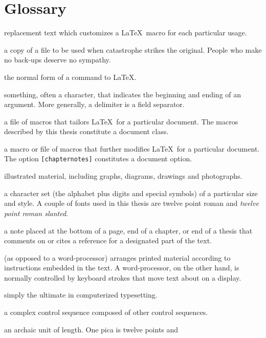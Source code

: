 \documentclass[11pt, proquest]{uwthesis}[2020/02/24]
\begin{document}
%
%
\tableofcontents
\listoffigures
\listoftables  %
 
%
%
\chapter*{Glossary}      %
\thispagestyle{plain}
%
\begin{glossary}
\item[argument] replacement text which customizes a \LaTeX\ macro for
each particular usage.
\item[back-up] a copy of a file to be used when catastrophe strikes
the original.  People who make no back-ups deserve
no sympathy.
\item[control sequence] the normal form of a command to \LaTeX.
\item[delimiter] something, often a character, that indicates
the beginning and ending of an argument.
More generally, a delimiter is a field separator.
\item[document class] a file of macros that tailors \LaTeX\ for
a particular document.  The macros described by this thesis
constitute a document class.
\item[document option] a macro or file of macros
that further modifies \LaTeX\ for
a particular document.  The option {\tt[chapternotes]}
constitutes a document option.
\item[figure] illustrated material, including graphs,
diagrams, drawings and photographs.
\item[font] a character set (the alphabet plus digits
and special symbols) of a particular size and style.  A couple of fonts
used in this thesis are twelve point roman and {\sl twelve point roman
slanted}.
\item[footnote] a note placed at the bottom of a page, end of a chapter,
or end of a thesis that comments on or cites a reference
for a designated part of the text.
\item[formatter] (as opposed to a word-processor) arranges printed
material according to instructions embedded in the text.
A word-processor, on the other hand, is normally controlled
by keyboard strokes that move text about on a display.
\item[\LaTeX] simply the ultimate in computerized typesetting.
\item[macro]  a complex control sequence composed of 
other control sequences.
\item[pica] an archaic unit of length.  One pica is twelve points and

\end{glossary}
\end{document}
